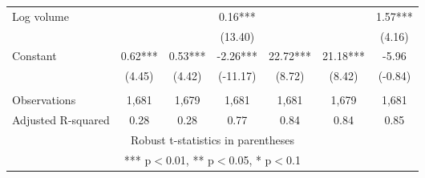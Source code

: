 \documentclass[]{article}
\begin{document}
\begin{tabular}{lcccccc}
Log volume &  &  & 0.16*** &  &  & 1.57*** \\
 &  &  & (13.40) &  &  & (4.16) \\
Constant & 0.62*** & 0.53*** & -2.26*** & 22.72*** & 21.18*** & -5.96 \\
 & (4.45) & (4.42) & (-11.17) & (8.72) & (8.42) & (-0.84) \\
 &  &  &  &  &  &  \\
Observations & 1,681 & 1,679 & 1,681 & 1,681 & 1,679 & 1,681 \\
 Adjusted R-squared & 0.28 & 0.28 & 0.77 & 0.84 & 0.84 & 0.85 \\ \hline
\multicolumn{7}{c}{ Robust t-statistics in parentheses} \\
\multicolumn{7}{c}{ *** p$<$0.01, ** p$<$0.05, * p$<$0.1} \\
\end{tabular}
\end{document}
